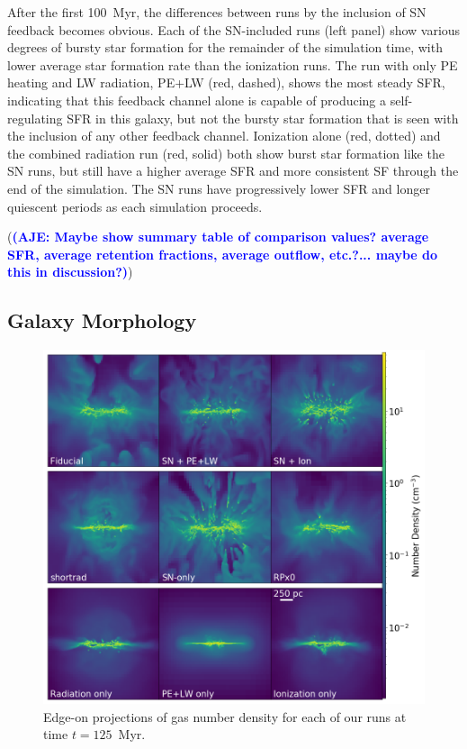 \documentclass[twocolumn]{aastex62}
\newcommand{\radstyle}{red, solid}
\newcommand{\ionstyle}{red, dotted}
\newcommand{\pelwstyle}{red, dashed}
\newcommand{\aje}[1]{\textcolor{blue}{\textbf{(AJE: #1)}}}
\begin{document}
After the first 100~Myr, the differences between runs by the inclusion of SN feedback becomes obvious. Each of the SN-included runs (left panel) show various degrees of bursty star formation for the remainder of the simulation time, with lower average star formation rate than the ionization runs. The run with only PE heating and LW radiation, PE+LW (\pelwstyle), shows the most steady SFR, indicating that this feedback channel alone is capable of producing a self-regulating SFR in this galaxy, but not the bursty star formation that is seen with the inclusion of any other feedback channel. Ionization alone (\ionstyle) and the combined radiation run (\radstyle) both show burst star formation like the SN runs, but still have a higher average SFR and more consistent SF through the end of the simulation. The SN runs have progressively lower SFR and longer quiescent periods as each simulation proceeds.

(\aje{Maybe show summary table of comparison values? average SFR, average retention fractions, average outflow, etc.?... maybe do this in discussion?})

\subsection{Galaxy Morphology}

\begin{figure}
  \centering
  \includegraphics[width=0.95\linewidth]{figures/proj_plot_n_x_125.png}
  \caption{Edge-on projections of gas number density for each of our runs at time $t=125$~Myr.}
  \label{fig:panel_plot_1}
\end{figure}
\end{document}
